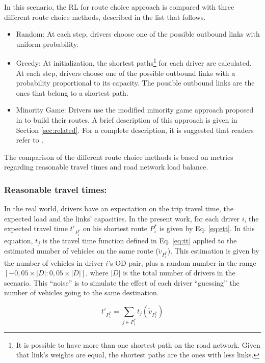 \documentclass{RITA}
\newcommand{\optRoute}[1]{\ensuremath{P_#1^*}}	%
\newcommand{\travTime}{\ensuremath{t_j}} 	%
\newcommand{\veh}{\ensuremath{v}}		%
\newcommand{\ett}[1]{\ensuremath{t'_{#1}}}		%
\newcommand{\expVeh}[1]{\ensuremath{\tilde{\veh}_{\optRoute{#1}}}}		%
\begin{document}
In this scenario, the RL for route choice approach is compared with three different route choice methods, described in the list that follows.

\begin{itemize}
  \item Random: At each step, drivers choose one of the possible outbound links with uniform probability.
  \item Greedy: At initialization, the shortest paths\footnote{It is possible to have more than one shortest path on the road network. Given that link's weights are equal, the shortest paths are the ones with less links.} for each driver are calculated. At each step, drivers choose one of the possible outbound links with a probability proportional to its capacity. The possible outbound links are the ones that belong to a shortest path. %
  \item Minority Game: Drivers use the modified minority game approach proposed in \cite{Galib&Moser2011} to build their routes. A brief description of this approach is given in Section \ref{sec:related}. For a complete description, it is suggested that readers refer to \cite{Galib&Moser2011}.
\end{itemize}

The comparison of the different route choice methods is based on metrics regarding reasonable travel times and road network load balance.

\subsubsection{Reasonable travel times:}
\label{sec:ttMetric}
In the real world, drivers have an expectation on the trip travel time, the expected load and the links' capacities. In the present work, for each driver $i$, the expected travel time $\ett{\optRoute{i}}$ on his shortest route $\optRoute{i}$ is given by Eq. \eqref{eq:ett}. In this equation, $\travTime$ is the travel time function defined in Eq. \eqref{eq:tt} applied to the estimated number of vehicles on the same route ($\expVeh{i}$). This estimation is given by the number of vehicles in driver $i$'s OD pair, plus a random number in the range $[-0,05 \times |D| : 0,05 \times |D|]$, where $|D|$ is the total number of drivers in the scenario. This ``noise'' is to simulate the effect of each driver ``guessing'' the number of vehicles going to the same destination.

\begin{equation}
\label{eq:ett}
\ett{\optRoute{i}} = \sum_{j \in \optRoute{i}}\travTime(\expVeh{i})
\end{equation}
\end{document}
